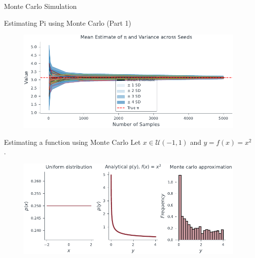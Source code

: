 \documentclass{beamer}
\begin{document}
\begin{section}{Monte Carlo Simulation}
\begin{frame}[fragile]{Estimating Pi using Monte Carlo (Part 1)}
\begin{center}
\begin{tikzpicture}[scale=2]
            \end{tikzpicture}
        \end{center}
    \end{frame}

    \begin{frame}
        \begin{figure}
                \centering
                \includegraphics[scale = 0.8]{../figures/prediction_var_mc_pi.pdf}
            \end{figure}
    \end{frame}

    \begin{frame}{Estimating a function using Monte Carlo}
        Let $x\in \mathcal{U}(-1,1)$ and $y = f(x) = x^2$.
        \begin{figure}
            \centering
        \includegraphics[scale=0.75]{../figures/mc_sampling_ex.pdf}
            \end{figure}    
    \end{frame}


\end{section}
\end{document}
